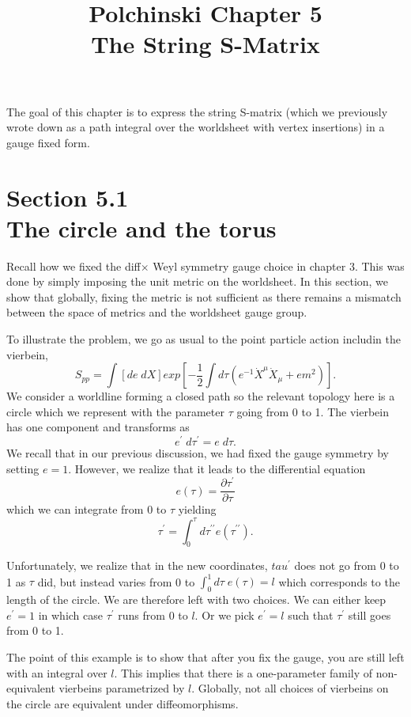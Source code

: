 \documentclass[12pt,letterpaper]{article}
\def\be{\begin{equation}}
\def\ee{\end{equation}}
\begin{document}
\title{Polchinski Chapter 5 \\ The String S-Matrix}
\date{}
\maketitle

The goal of this chapter is to express the string S-matrix (which we previously wrote down as a path integral over the worldsheet with vertex insertions) in a gauge fixed form.

\section*{Section 5.1 \\The circle and the torus}
Recall how we fixed the diff$\times$ Weyl symmetry gauge choice in chapter 3.  This was done by simply imposing the unit metric on the worldsheet.  In this section, we show that globally, fixing the metric is not sufficient as there remains a mismatch between the space of metrics and the worldsheet gauge group.

To illustrate the problem, we go as usual to the point particle action includin the vierbein,
\be
S_{pp}=\int [de\;dX]exp\left[-\frac{1}{2}\int d\tau\left(e^{-1}\dot{X}^{\mu}\dot{X}_{\mu}+em^{2}\right)\right].
\ee
We consider a worldline forming a closed path so the relevant topology here is a circle which we represent with the parameter $\tau$ going from 0 to 1.  The vierbein has one component and transforms as
\be 
e^{\prime}\;d\tau^{\prime}=e\;d\tau.
\ee
We recall that in our previous discussion, we had fixed the gauge symmetry by setting $e = 1$.  However, we realize that it leads to the differential equation
\be 
e(\tau)=\frac{\partial \tau^{\prime}}{\partial \tau}
\ee
which we can integrate from 0 to $\tau$ yielding
\be 
\tau^{\prime} = \int_{0}^{\tau}d\tau^{\prime\prime}e(\tau^{\prime\prime}).
\ee

Unfortunately, we realize that in the new coordinates, $tau^{\prime}$
does not go from 0 to 1 as $\tau$ did, but instead varies from 0 to $\int_{0}^{1}d\tau\;e(\tau) = l$ which corresponds to the length of the circle.  We are therefore left with two choices.  We can either keep $e^{\prime}=1$ in which case $\tau^{\prime}$ runs from 0 to $l$.  Or we pick $e^{\prime}=l$ such that $\tau^{\prime}$ still goes from 0 to 1.

The point of this example is to show that after you fix the gauge, you are still left with an integral over $l$. This implies that there is a one-parameter family of non-equivalent vierbeins parametrized by $l$.  Globally, not all choices of vierbeins on the circle are equivalent under diffeomorphisms.  
\\
\end{document}
